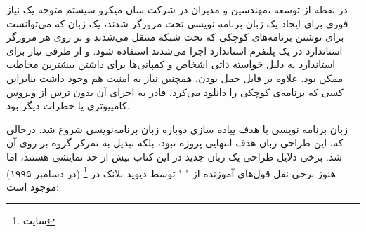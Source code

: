 \documentclass[a4paper,12pt]{report}
\begin{document}
	 در نقطه از توسعه 
	  ،مهندسین و مدیران در شرکت سان میکرو سیستم متوجه یک نیاز فوری برای ایجاد یک زبان برنامه نویسی تحت مرورگر  شدند، 
	 یک زبان که می‌توانست برای نوشتن برنامه‌های کوچکی که تحت شبکه متنقل می‌شدند و بر روی هر مرورگر استاندارد در یک پلتفرم استاندارد اجرا می‌شدند استفاده شود.
	و از طرفی نیاز برای استاندارد به دلیل خواسته ذاتی اشخاص و کمپانی‌ها برای داشتن بیشترین مخاطب ممکن بود. علاوه بر قابل حمل بودن، همچنین نیاز به امنیت هم وجود داشت بنابراین کسی که برنامه‌ی کوچکی را دانلود می‌کرد، قادر به اجرای آن بدون ترس از ویروس کامپیوتری یا خطرات دیگر بود.
	
	زبان برنامه نویسی
  با هدف پیاده سازی دوباره زبان برنامه‌نویسی 
  شروع شد. درحالی که، این طراحی زبان هدف انتهایی پروژه نبود، بلکه تبدیل به تمرکز گروه بر روی آن شد.
  برخی دلایل طراحی یک زبان جدید در این کتاب بیش از حد نمایشی هستند، اما هنوز برخی نقل قول‌های آموزنده از "
	"
  توسط دیوید بلانک در 
	\footnote{
  سایت
	}
	(در دسامبر ۱۹۹۵) موجود است:
	
\end{document}
